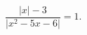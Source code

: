 \begin{ex}[type=equation]
	\begin{condition}
		$\dfrac{\big|x\big| - 3}{\big|x^2 - 5x -6\big|} = 1.$
	\end{condition}
\end{ex}